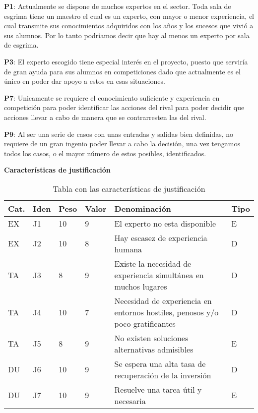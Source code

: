 \begin{compactitem}
  \item[\textbf{P1}:] Actualmente se dispone de muchos expertos en el sector. Toda sala de esgrima
     tiene un maestro el cual es un experto, con mayor o menor experiencia, el cual transmite
     sus conocimientos adquiridos con los años y los sucesos que vivió a sus alumnos. Por lo tanto
     podríamos decir que hay al menos un experto por sala de esgrima.
  \item[\textbf{P3}:] El experto escogido tiene especial interés en el proyecto, puesto que
     serviría de gran ayuda para sus alumnos en competiciones dado que actualmente es el único
     en poder dar apoyo a estos en esas situaciones.
  \item[\textbf{P7}:] Unicamente se requiere el conocimiento suficiente y experiencia en competición
     para poder identificar las acciones del rival para poder decidir que acciones llevar a cabo
     de manera que se contrarresten las del rival.
  \item[\textbf{P9}:] Al ser una serie de casos con unas entradas y salidas bien definidas, no requiere
     de un gran ingenio poder llevar a cabo la decisión, una vez tengamos todos los casos, o el mayor
     número de estos posibles, identificados.
\end{compactitem}


\textbf{Características de justificación}
\begin{table}[htb]%
  \centering
  \caption{Tabla con las características de justificación}
  \label{tab:anchura}
  \begin{tabular}{ | l | l | l | l | p{8cm} | l | }
    \hline
    Cat. & Iden & Peso & Valor & Denominación & Tipo \\ \hline
    EX & J1 & 10 & 9 & El experto no esta disponible & E \\ \hline
    EX & J2 & 10 & 8 & Hay escasez de experiencia humana & D \\ \hline
    TA & J3 & 8 & 9 & Existe la necesidad de experiencia simultánea en muchos lugares & D \\ \hline
    TA & J4 & 10 & 7 & Necesidad de experiencia en entornos hostiles, penosos y/o poco gratificantes & D \\ \hline
    TA & J5 & 8 & 9 & No existen soluciones alternativas admisibles & E \\ \hline
    DU & J6 & 10 & 9 & Se espera una alta tasa de recuperación de la inversión & D \\ \hline
    DU & J7 & 10 & 9 & Resuelve una tarea útil y necesaria & E \\ \hline
   \end{tabular}
\end{table}


